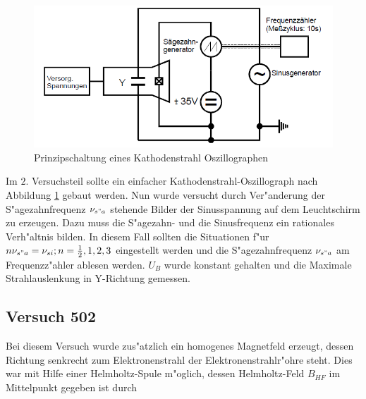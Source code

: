 		\begin{figure}[h]
			\centering
			\includegraphics[width = 14cm]{img/501b.png}
			\caption{Prinzipschaltung eines Kathodenstrahl Oszillographen}
			\label{501b}
		\end{figure}

		Im $2.$ Versuchsteil sollte ein einfacher Kathodenstrahl-Oszillograph nach Abbildung \ref{501b} gebaut werden.
		Nun wurde versucht durch Ver"anderung der S"agezahnfrequenz $\nu_{s"a}$ stehende Bilder der Sinusspannung auf dem Leuchtschirm zu erzeugen.
		Dazu muss die S"agezahn- und die Sinusfrequenz ein rationales Verh"altnis bilden. In diesem Fall sollten die Situationen f"ur $n\nu_{s"a} = \nu_{si}; n = \frac{1}{2}, 1, 2, 3 $ eingestellt werden und die S"agezahnfrequenz $\nu_{s"a}$ am Fre\-quenz\-z"ah\-ler ablesen werden.
		$U_B$ wurde konstant gehalten und die Maximale Strahlauslenkung in Y-Richtung gemessen.

	\subsection{Versuch 502} 
	\label{sub:502}
		
		Bei diesem Versuch wurde zus"atzlich ein homogenes Magnetfeld erzeugt, dessen Richtung senkrecht zum Elektronenstrahl der Elektronenstrahlr"ohre steht. Dies war mit Hilfe einer Helmholtz-Spule m"oglich, dessen Helmholtz-Feld $B_{HF}$ im Mittelpunkt gegeben ist durch


